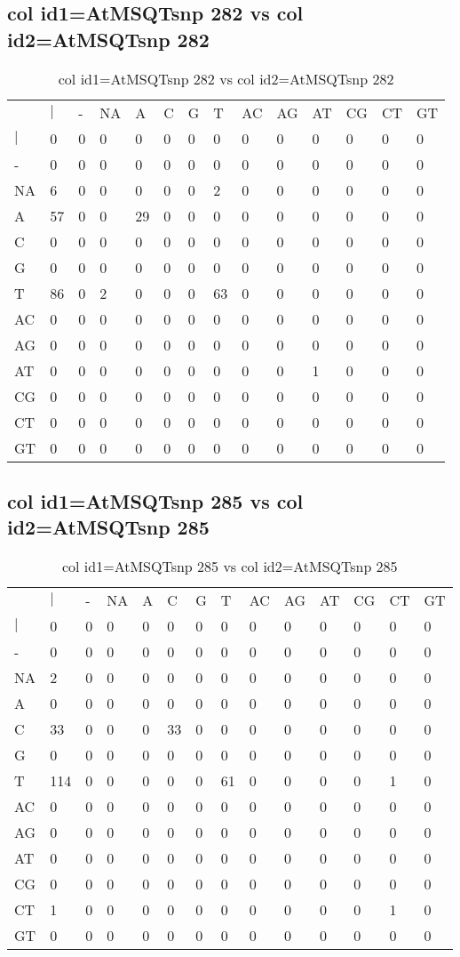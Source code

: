 \subsection{col id1=AtMSQTsnp 282 vs col id2=AtMSQTsnp 282}
\begin{center}
\begin{longtable}{|l|l|l|l|l|l|l|l|l|l|l|l|l|l|}
\caption{col id1=AtMSQTsnp 282 vs col id2=AtMSQTsnp 282} \label{table_dm630}\\
\hline
\\
\hline
&$|$&-&NA&A&C&G&T&AC&AG&AT&CG&CT&GT\\
$|$&0&0&0&0&0&0&0&0&0&0&0&0&0\\
-&0&0&0&0&0&0&0&0&0&0&0&0&0\\
NA&6&0&0&0&0&0&2&0&0&0&0&0&0\\
A&57&0&0&29&0&0&0&0&0&0&0&0&0\\
C&0&0&0&0&0&0&0&0&0&0&0&0&0\\
G&0&0&0&0&0&0&0&0&0&0&0&0&0\\
T&86&0&2&0&0&0&63&0&0&0&0&0&0\\
AC&0&0&0&0&0&0&0&0&0&0&0&0&0\\
AG&0&0&0&0&0&0&0&0&0&0&0&0&0\\
AT&0&0&0&0&0&0&0&0&0&1&0&0&0\\
CG&0&0&0&0&0&0&0&0&0&0&0&0&0\\
CT&0&0&0&0&0&0&0&0&0&0&0&0&0\\
GT&0&0&0&0&0&0&0&0&0&0&0&0&0\\
\hline
\end{longtable}
\end{center}

\subsection{col id1=AtMSQTsnp 285 vs col id2=AtMSQTsnp 285}
\begin{center}
\begin{longtable}{|l|l|l|l|l|l|l|l|l|l|l|l|l|l|}
\caption{col id1=AtMSQTsnp 285 vs col id2=AtMSQTsnp 285} \label{table_dm632}\\
\hline
\\
\hline
&$|$&-&NA&A&C&G&T&AC&AG&AT&CG&CT&GT\\
$|$&0&0&0&0&0&0&0&0&0&0&0&0&0\\
-&0&0&0&0&0&0&0&0&0&0&0&0&0\\
NA&2&0&0&0&0&0&0&0&0&0&0&0&0\\
A&0&0&0&0&0&0&0&0&0&0&0&0&0\\
C&33&0&0&0&33&0&0&0&0&0&0&0&0\\
G&0&0&0&0&0&0&0&0&0&0&0&0&0\\
T&114&0&0&0&0&0&61&0&0&0&0&1&0\\
AC&0&0&0&0&0&0&0&0&0&0&0&0&0\\
AG&0&0&0&0&0&0&0&0&0&0&0&0&0\\
AT&0&0&0&0&0&0&0&0&0&0&0&0&0\\
CG&0&0&0&0&0&0&0&0&0&0&0&0&0\\
CT&1&0&0&0&0&0&0&0&0&0&0&1&0\\
GT&0&0&0&0&0&0&0&0&0&0&0&0&0\\
\hline
\end{longtable}
\end{center}

